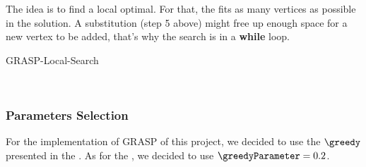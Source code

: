\subsubsection{\localSearchText}

The idea is to find a local optimal. For that, the  fits as many vertices as possible in the solution. A substitution (step 5 above) might free up enough space for a new vertex to be added, that's why the search is in a \textbf{while} loop.

\begin{algorithm}[H]
    \caption{GRASP-Local-Search}
    \begin{algorithmic}[1]
            \EndIf
        \EndWhile
        \\
    \end{algorithmic}
    \label{algorithm:grasp-local-search}
\end{algorithm}

\subsubsection{Parameters Selection}

For the implementation of GRASP of this project, we decided to use the \greedyCriteriaText $\greedy$ presented in the . As for the \greedyParameterText \greedyParameter, we decided to use $\greedyParameter = 0.2$.
